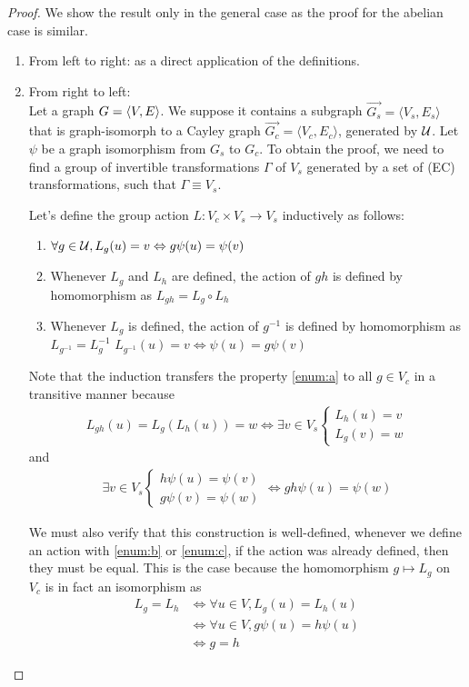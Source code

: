 \begin{proof}
We show the result only in the general case as the proof for the abelian case is similar.
\begin{enumerate}
	\item From left to right: as a direct application of the definitions.

	\item From right to left:\\
Let a graph $G = \langle V, E \rangle$. We suppose it contains a subgraph $\vec{G_s} = \langle V_s, E_s \rangle$ that is graph-isomorph to a Cayley graph $\vec{G_c} = \langle V_c, E_c \rangle$, generated by $\mathcal{U}$. Let $\psi$ be a graph isomorphism from $G_s$ to $G_c$. To obtain the proof, we need to find a group of invertible transformations $\Gamma$ of $V_s$ generated by a set of (EC) transformations, such that $\Gamma \equiv V_s$.

Let's define the group action $L : V_c \times V_s \rightarrow V_s$ inductively as follows:
\begin{enumerate}[label=(\alph*)]
  \item $\forall g \in \mathcal{U}, L_g(u) = v \Leftrightarrow g\psi(u) = \psi(v)$ \label{enum:a}
  \item Whenever $L_g$ and $L_h$ are defined, the action of $gh$ is defined by homomorphism as $L_{gh}= L_g \circ L_h$ \label{enum:b}
  \item Whenever $L_g$ is defined, the action of $g^{-1}$ is defined by homomorphism as $L_{g^{-1}}=L_g^{-1}$ \ie $L_{g^{-1}}(u) = v \Leftrightarrow \psi(u) = g\psi(v)$ \label{enum:c}
\end{enumerate}

Note that the induction transfers the property \ref{enum:a} to all $g \in V_c$ in a transitive manner because
\begin{gather*}
L_{gh}(u) = L_g(L_h(u)) = w \Leftrightarrow \exists v \in V_s
\begin{cases}
L_h(u) = v\\
L_g(v) = w
\end{cases}
\end{gather*}
and
\begin{gather*}
\exists v \in V_s
\begin{cases}
h\psi(u) = \psi(v)\\
g\psi(v) = \psi(w)
\end{cases}
\Leftrightarrow gh\psi(u) = \psi(w)
\end{gather*}

We must also verify that this construction is well-defined, \ie whenever we define an action with \ref{enum:b} or \ref{enum:c}, if the action was already defined, then they must be equal. This is the case because the homomorphism $g \mapsto L_g$ on $V_c$ is in fact an isomorphism as
\begin{align*}
L_g = L_h & \Leftrightarrow \forall u \in V, L_g(u) = L_h(u)\\
 & \Leftrightarrow \forall u \in V, g\psi(u) = h\psi(u)\\
 & \Leftrightarrow g = h
\end{align*}


\end{enumerate}
\end{proof}

